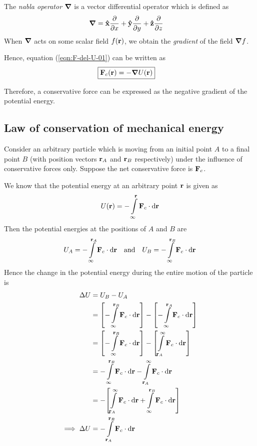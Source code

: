 		The \emph{nabla operator} $\grad$ is a vector differential operator which is defined as
		\begin{align*}
			\grad&=\vu{x}\pdv{x}+\vu{y}\pdv{y}+\vu{z}\pdv{z}
		\end{align*}
		When $\grad$ acts on some scalar field $f(\vb{r})$, we obtain the \emph{gradient} of the field $\grad{f}$.
		
		Hence, equation (\ref{eqn:F-del-U-01}) can be written as
		\begin{align*}
			\Aboxed{\vb{F}_c(\vb{r})&=-\grad{U(\vb{r})}}
		\end{align*}
		
		Therefore, a conservative force can be expressed as the negative gradient of the potential energy.
	
	\setcounter{equation}{0}
	\subsection{Law of conservation of mechanical energy}
		Consider an arbitrary particle which is moving from an initial point $A$ to a final point $B$ (with position vectors $\vb{r}_A$ and $\vb{r}_B$ respectively) under the influence of conservative forces only. Suppose the net conservative force is $\vb{F}_c$.
		
		We know that the potential energy at an arbitrary point $\vb{r}$ is given as
		\begin{align*}
			U(\vb{r})=-\int\limits_{\infty}^{\vb{r}}{\vb{F}_c\cdot\dd{\vb{r}}}
		\end{align*}
		Then the potential energies at the positions of $A$ and $B$ are
		\begin{align*}
			U_A=-\int\limits_{\infty}^{\vb{r}_A}{\vb{F}_c\cdot\dd{\vb{r}}} \qq{and} U_B=-\int\limits_{\infty}^{\vb{r}_B}{\vb{F}_c\cdot\dd{\vb{r}}}
		\end{align*}
		Hence the change in the potential energy during the entire motion of the particle is
		\begin{align}
			\Delta U&=U_B - U_A \nonumber\\
				&=\qty[-\int\limits_{\infty}^{\vb{r}_B}{\vb{F}_c\cdot\dd{\vb{r}}}] - \qty[-\int\limits_{\infty}^{\vb{r}_A}{\vb{F}_c\cdot\dd{\vb{r}}}] \nonumber\\
				&=\qty[-\int\limits_{\infty}^{\vb{r}_B}{\vb{F}_c\cdot\dd{\vb{r}}}] - \qty[\int\limits_{\vb{r}_A}^{\infty}{\vb{F}_c\cdot\dd{\vb{r}}}] \nonumber\\
				&=-\int\limits_{\infty}^{\vb{r}_B}{\vb{F}_c\cdot\dd{\vb{r}}} - \int\limits_{\vb{r}_A}^{\infty}{\vb{F}_c\cdot\dd{\vb{r}}} \nonumber\\
				&=-\qty[\int\limits_{\vb{r}_A}^{\infty}{\vb{F}_c\cdot\dd{\vb{r}}} + \int\limits_{\infty}^{\vb{r}_B}{\vb{F}_c\cdot\dd{\vb{r}}}] \nonumber\\
			\implies\Delta U&=-\int\limits_{\vb{r}_A}^{\vb{r}_B}{\vb{F}_c\cdot\dd{\vb{r}}} \label{eqn:Delta-U-cons-eng}
		\end{align}
		
